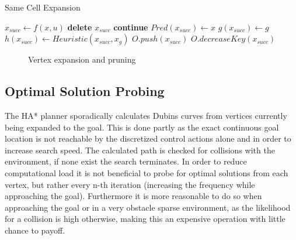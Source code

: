 \begin{algorithm}
\caption{Same Cell Expansion}\label{alg:sameCellExpansion}
    \begin{algorithmic}[1]
                \State $x_{succ} \gets f(x,u)$
		                        \State \textbf{delete} $x_{succ}$
                        		 \State \textbf{continue}
        	                \EndIf            
            	                \State $Pred(x_{succ}) \gets x$
                	            \State $g(x_{succ}) \gets g$
                    	        \State $h(x_{succ}) \gets Heuristic(x_{succ}, x_g)$
                            	    \State $O.push(x_{succ})$
                           		\Else
                                	\State $O.decreaseKey(x_{succ})$
                        \EndIf
                        \EndIf
                    \EndIf
                \EndFor
    \end{algorithmic}
\end{algorithm}

\begin{figure}[h]
    \caption{Vertex expansion and pruning}
    \label{fig:expansionPruning}
\end{figure}

\subsection{Optimal Solution Probing}
The HA* planner sporadically calculates Dubins curves from vertices currently being expanded to the goal. This is done partly as the exact continuous goal location is not reachable by the discretized control actions alone and in order to increase search speed. The calculated path is checked for collisions with the environment, if none exist the search terminates. In order to reduce computational load it is not beneficial to probe for optimal solutions from each vertex, but rather every n-th iteration (increasing the frequency while approaching the goal). Furthermore it is more reasonable to do so when approaching the goal or in a very obstacle sparse environment, as the likelihood for a collision is high otherwise, making this an expensive operation with little chance to payoff.

